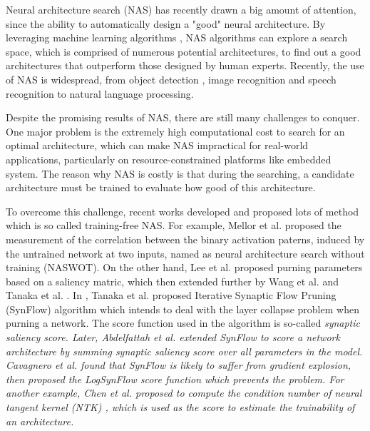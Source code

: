 \documentclass[sigconf]{acmart}
\begin{document}
    Neural architecture search (NAS) has recently drawn a big amount of 
    attention, since the ability to automatically design a "good" neural 
    architecture. By leveraging machine learning algorithms \cite{https://doi.org/10.48550/arxiv.1611.01578}, 
    NAS algorithms can explore a search space, which is comprised of numerous 
    potential architectures, to find out a good architectures that outperform 
    those designed by human experts. Recently, the use of NAS is 
    widespread, from object detection \cite{https://doi.org/10.48550/arxiv.2111.13336}, 
    image recognition \cite{https://doi.org/10.48550/arxiv.2006.04647} 
    and speech recognition \cite{https://doi.org/10.48550/arxiv.2011.05649} 
    \cite{mehrotra2021nasbenchasr} to natural language 
    processing. \cite{jiang-etal-2019-improved} 
    \cite{https://doi.org/10.48550/arxiv.2006.07116} 
    \cite{https://doi.org/10.48550/arxiv.2005.14187} 

    Despite the promising results of NAS, there are still many challenges 
    to conquer. One major problem is the extremely high computational 
    cost to search for an optimal architecture, which can make NAS impractical 
    for real-world applications, particularly on resource-constrained 
    platforms like embedded system. The reason why NAS is costly is that 
    during the searching, a candidate architecture must be trained to 
    evaluate how good of this architecture. 

    To overcome this challenge, recent works developed and proposed lots 
    of method which is so called training-free NAS. 
    For example, Mellor et al. \cite{https://doi.org/10.48550/arxiv.2006.04647} proposed the 
    measurement of the correlation between the binary activation paterns, 
    induced by the untrained network at two inputs, named as neural architecture 
    search without training (NASWOT). 
    On the other hand, Lee et al. \cite{lee2019snip} proposed purning parameters based on a saliency matric, 
    which then extended further by Wang et al. \cite{wang2020picking} and Tanaka et al. \cite{tanaka2020pruning}. 
    In \cite{tanaka2020pruning}, Tanaka et al. proposed Iterative Synaptic Flow Pruning 
    (SynFlow) algorithm which intends to deal with the layer collapse problem when purning a network. 
    The score function used in the algorithm is so-called \it{synaptic saliency} \rm{score}. 
    Later, Abdelfattah et al. \cite{abdelfattah2021zerocost} extended SynFlow to score 
    a network architecture by summing synaptic saliency score over all parameters in the model. 
    Cavagnero et al. \cite{Cavagnero_2023} found that SynFlow is likely to suffer from gradient explosion, then 
    proposed the LogSynFlow score function which prevents the problem. 
    For another example, Chen et al. \cite{https://doi.org/10.48550/arxiv.2102.11535} proposed to compute the condition 
    number of neural tangent kernel (NTK) \cite{https://doi.org/10.48550/arxiv.2203.09137} 
    \cite{https://doi.org/10.48550/arxiv.2109.00817}, which is used as the score to estimate the trainability of an 
    architecture. 
\end{document}
